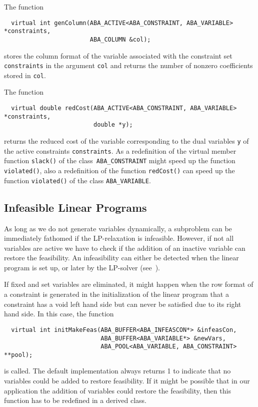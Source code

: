 The function 
\begin{verbatim}
  virtual int genColumn(ABA_ACTIVE<ABA_CONSTRAINT, ABA_VARIABLE> *constraints,
                        ABA_COLUMN &col);
\end{verbatim}
\noindent
stores the column format of the variable associated with the constraint
set {\tt constraints} in the argument {\tt col} and returns the number of nonzero coefficients
stored in {\tt col}.

The function
\begin{verbatim}
  virtual double redCost(ABA_ACTIVE<ABA_CONSTRAINT, ABA_VARIABLE> *constraints,
                         double *y);
\end{verbatim}
\noindent
returns the reduced cost of the variable corresponding to the dual variables
{\tt y} of the active constraints {\tt constraints}.
As a redefinition of the virtual member
function {\tt slack()} of the class~{\tt ABA\_CONSTRAINT}
might speed up the 
function {\tt violated()}, 
also a redefinition
of the function {\tt redCost()} can speed up the 
function {\tt violated()}
of the class {\tt ABA\_VARIABLE}.

\subsection{Infeasible Linear Programs}

As long as we do not generate variables dynamically, a subproblem can be
immediately fathomed if the LP-relaxation is infeasible.
However, if not all variables are active we have to check if the addition
of an inactive variable can restore the feasibility. 
An infeasibility can either be detected when the linear program is
set up, or later by the LP-solver (see~\cite{Thi95}).

If fixed and set variables are eliminated, it might happen 
when the row format of a constraint is generated in the initialization
of the linear program that a constraint has a void
left hand side but can never be satisfied due to its right hand side. 
In this case, the function
\begin{verbatim}
  virtual int initMakeFeas(ABA_BUFFER<ABA_INFEASCON*> &infeasCon,
                           ABA_BUFFER<ABA_VARIABLE*> &newVars,
                           ABA_POOL<ABA_VARIABLE, ABA_CONSTRAINT> **pool);
\end{verbatim}
\noindent
is called. The default implementation always returns 1 to indicate
that no variables could be added to restore feasibility. If it might
be possible that in our application the addition of variables could
restore the feasibility, then this function has to be redefined in
a derived class.

